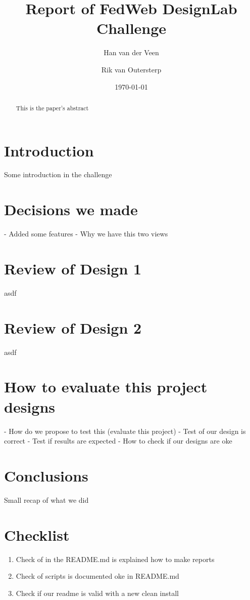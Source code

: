 \documentclass[12pt]{article}
\title{Report of FedWeb DesignLab Challenge}
\author{
        Han van der Veen \\
            \and
			Rik van Outersterp
}
\date{\today}
\begin{document}
\maketitle

\begin{abstract}
This is the paper's abstract
\end{abstract}

\section{Introduction}
Some introduction in the challenge

\section{Decisions we made}
- Added some features
- Why we have this two views

\section{Review of Design 1}
asdf

\section{Review of Design 2}
asdf

\section{How to evaluate this project designs}
- How do we propose to test this (evaluate this project)
- Test of our design is correct
- Test if results are expected
- How to check if our designs are oke

\section{Conclusions}
Small recap of what we did


\section{Checklist}
\begin{enumerate}
\item Check of in the README.md is explained how to make reports
\item Check of scripts is documented oke in README.md
\item Check if our readme is valid with a new clean install
\end{enumerate}



\end{document}
